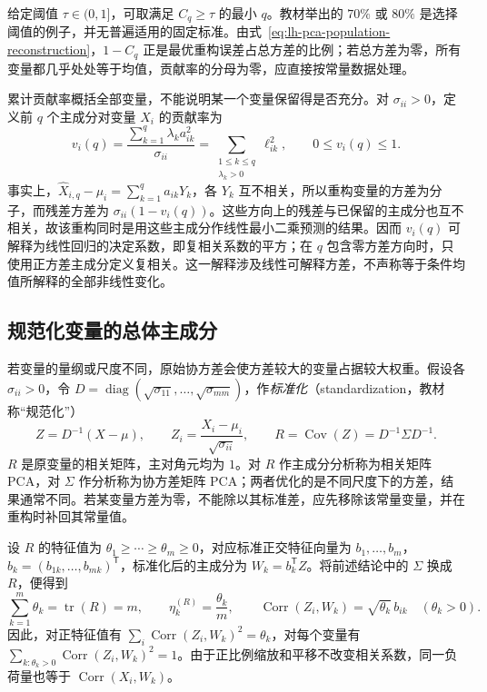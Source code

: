 给定阈值 $\tau\in(0,1]$，可取满足 $C_q\geq\tau$ 的最小 $q$。教材举出的 $70\%$ 或 $80\%$ 是选择阈值的例子，并无普遍适用的固定标准。由式~\eqref{eq:lh-pca-population-reconstruction}，$1-C_q$ 正是最优重构误差占总方差的比例；若总方差为零，所有变量都几乎处处等于均值，贡献率的分母为零，应直接按常量数据处理。

累计贡献率概括全部变量，不能说明某一个变量保留得是否充分。对 $\sigma_{ii}>0$，定义前 $q$ 个主成分对变量 $X_i$ 的贡献率为
\begin{equation}
v_i(q)=\frac{\sum_{k=1}^q\lambda_k a_{ik}^2}{\sigma_{ii}}
=\sum_{\substack{1\leq k\leq q\\\lambda_k>0}}\ell_{ik}^2,
\qquad 0\leq v_i(q)\leq1.
\label{eq:lh-pca-variable-contribution}
\end{equation}
事实上，$\widehat X_{i,q}-\mu_i=\sum_{k=1}^qa_{ik}Y_k$，各 $Y_k$ 互不相关，所以重构变量的方差为分子，而残差方差为 $\sigma_{ii}(1-v_i(q))$。这些方向上的残差与已保留的主成分也互不相关，故该重构同时是用这些主成分作线性最小二乘预测的结果。因而 $v_i(q)$ 可解释为线性回归的决定系数，即复相关系数的平方；在 $q$ 包含零方差方向时，只使用正方差主成分定义复相关。这一解释涉及线性可解释方差，不声称等于条件均值所解释的全部非线性变化。

\subsection{规范化变量的总体主成分}
\label{subsec:lh-pca-standardized-population}

若变量的量纲或尺度不同，原始协方差会使方差较大的变量占据较大权重。假设各 $\sigma_{ii}>0$，令 $D=\operatorname{diag}(\sqrt{\sigma_{11}},\ldots,\sqrt{\sigma_{mm}})$，作\emph{标准化}（standardization，教材称“规范化”）
\begin{equation}
Z=D^{-1}(X-\mu),\qquad
Z_i=\frac{X_i-\mu_i}{\sqrt{\sigma_{ii}}},\qquad
R=\operatorname{Cov}(Z)=D^{-1}\Sigma D^{-1}.
\label{eq:lh-pca-standardization}
\end{equation}
$R$ 是原变量的相关矩阵，主对角元均为 $1$。对 $R$ 作主成分分析称为相关矩阵 PCA，对 $\Sigma$ 作分析称为协方差矩阵 PCA；两者优化的是不同尺度下的方差，结果通常不同。若某变量方差为零，不能除以其标准差，应先移除该常量变量，并在重构时补回其常量值。

设 $R$ 的特征值为 $\theta_1\geq\cdots\geq\theta_m\geq0$，对应标准正交特征向量为 $b_1,\ldots,b_m$，$b_k=(b_{1k},\ldots,b_{mk})^{\mathsf T}$，标准化后的主成分为 $W_k=b_k^{\mathsf T}Z$。将前述结论中的 $\Sigma$ 换成 $R$，便得到
\begin{equation}
\sum_{k=1}^m\theta_k=\operatorname{tr}(R)=m,\qquad
\eta_k^{(R)}=\frac{\theta_k}{m},\qquad
\operatorname{Corr}(Z_i,W_k)=\sqrt{\theta_k}\,b_{ik}
\quad(\theta_k>0).
\label{eq:lh-pca-standardized-properties}
\end{equation}
因此，对正特征值有 $\sum_i\operatorname{Corr}(Z_i,W_k)^2=\theta_k$，对每个变量有 $\sum_{k:\theta_k>0}\operatorname{Corr}(Z_i,W_k)^2=1$。由于正比例缩放和平移不改变相关系数，同一负荷量也等于 $\operatorname{Corr}(X_i,W_k)$。

